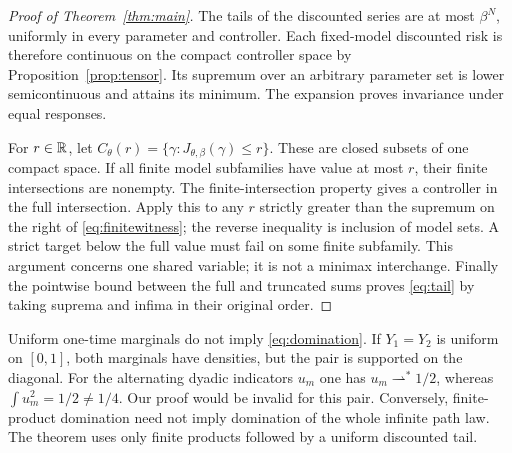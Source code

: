 \begin{proof}[Proof of Theorem~\ref{thm:main}]
The tails of the discounted series are at most $\beta^N$, uniformly in every parameter and controller. Each fixed-model discounted risk is therefore continuous on the compact controller space by Proposition~\ref{prop:tensor}. Its supremum over an arbitrary parameter set is lower semicontinuous and attains its minimum. The expansion proves invariance under equal responses.

For $r\in\mathbb R$, let $C_\theta(r)=\{\gamma:J_{\theta,\beta}(\gamma)\le r\}$. These are closed subsets of one compact space. If all finite model subfamilies have value at most $r$, their finite intersections are nonempty. The finite-intersection property gives a controller in the full intersection. Apply this to any $r$ strictly greater than the supremum on the right of \eqref{eq:finitewitness}; the reverse inequality is inclusion of model sets. A strict target below the full value must fail on some finite subfamily. This argument concerns one shared variable; it is not a minimax interchange. Finally the pointwise bound between the full and truncated sums proves \eqref{eq:tail} by taking suprema and infima in their original order.
\end{proof}

\begin{remark}\label{rem:diagonal}
Uniform one-time marginals do not imply \eqref{eq:domination}. If $Y_1=Y_2$ is uniform on $[0,1]$, both marginals have densities, but the pair is supported on the diagonal. For the alternating dyadic indicators $u_m$ one has $u_m\rightharpoonup^*1/2$, whereas $\int u_m^2=1/2\ne1/4$. Our proof would be invalid for this pair. Conversely, finite-product domination need not imply domination of the whole infinite path law. The theorem uses only finite products followed by a uniform discounted tail.
\end{remark}
